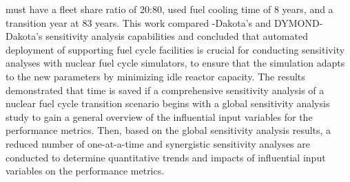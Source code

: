 must have a fleet share ratio of 20:80, used fuel cooling time 
of 8 years, and a transition year at 83 years. 
This work compared \Cyclus-Dakota's and DYMOND-Dakota's sensitivity 
analysis capabilities 
and concluded that automated deployment of supporting fuel cycle 
facilities is crucial for conducting sensitivity analyses 
with nuclear fuel cycle simulators, to ensure that the simulation 
adapts to the new parameters by minimizing idle reactor capacity. 
The results demonstrated that time is saved if a comprehensive 
sensitivity analysis of a nuclear fuel cycle transition scenario 
begins with a global sensitivity analysis study to gain a general 
overview of the influential input variables for the performance metrics. 
Then, based on the global sensitivity analysis results, a reduced number of 
one-at-a-time and synergistic sensitivity analyses are conducted 
to determine quantitative trends and impacts of influential 
input variables on the performance metrics.